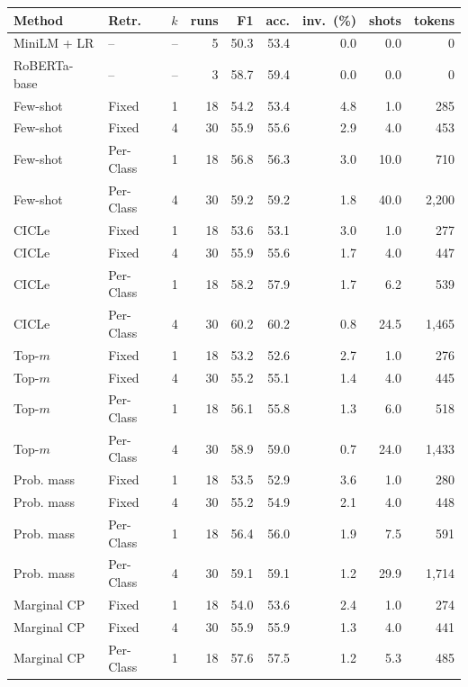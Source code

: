 \begin{tabular}{llrrrrrrr}
\toprule
Method & Retr. & $k$ & runs & F1 & acc. & inv.\ (\%) & shots & tokens \\
\midrule
MiniLM + LR & -- & -- & 5 & 50.3 & 53.4 & 0.0 & 0.0 & 0 \\
RoBERTa-base & -- & -- & 3 & 58.7 & 59.4 & 0.0 & 0.0 & 0 \\
\midrule
Few-shot & Fixed & 1 & 18 & 54.2 & 53.4 & 4.8 & 1.0 & 285 \\
Few-shot & Fixed & 4 & 30 & 55.9 & 55.6 & 2.9 & 4.0 & 453 \\
Few-shot & Per-Class & 1 & 18 & 56.8 & 56.3 & 3.0 & 10.0 & 710 \\
Few-shot & Per-Class & 4 & 30 & 59.2 & 59.2 & 1.8 & 40.0 & 2,200 \\
CICLe & Fixed & 1 & 18 & 53.6 & 53.1 & 3.0 & 1.0 & 277 \\
CICLe & Fixed & 4 & 30 & 55.9 & 55.6 & 1.7 & 4.0 & 447 \\
CICLe & Per-Class & 1 & 18 & 58.2 & 57.9 & 1.7 & 6.2 & 539 \\
CICLe & Per-Class & 4 & 30 & 60.2 & 60.2 & 0.8 & 24.5 & 1,465 \\
\midrule
Top-$m$ & Fixed & 1 & 18 & 53.2 & 52.6 & 2.7 & 1.0 & 276 \\
Top-$m$ & Fixed & 4 & 30 & 55.2 & 55.1 & 1.4 & 4.0 & 445 \\
Top-$m$ & Per-Class & 1 & 18 & 56.1 & 55.8 & 1.3 & 6.0 & 518 \\
Top-$m$ & Per-Class & 4 & 30 & 58.9 & 59.0 & 0.7 & 24.0 & 1,433 \\
Prob. mass & Fixed & 1 & 18 & 53.5 & 52.9 & 3.6 & 1.0 & 280 \\
Prob. mass & Fixed & 4 & 30 & 55.2 & 54.9 & 2.1 & 4.0 & 448 \\
Prob. mass & Per-Class & 1 & 18 & 56.4 & 56.0 & 1.9 & 7.5 & 591 \\
Prob. mass & Per-Class & 4 & 30 & 59.1 & 59.1 & 1.2 & 29.9 & 1,714 \\
Marginal CP & Fixed & 1 & 18 & 54.0 & 53.6 & 2.4 & 1.0 & 274 \\
Marginal CP & Fixed & 4 & 30 & 55.9 & 55.9 & 1.3 & 4.0 & 441 \\
Marginal CP & Per-Class & 1 & 18 & 57.6 & 57.5 & 1.2 & 5.3 & 485 \\

\end{tabular}
